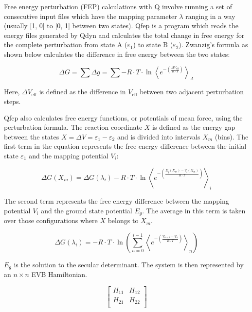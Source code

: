 \documentclass{article}
\begin{document}
Free energy perturbation (FEP) calculations with Q involve running a set of consecutive input files which have the mapping parameter $\lambda$ ranging in a way (usually [1, 0] to [0, 1] between two states). Qfep is a program which reads the energy files generated by Qdyn and calculates the total change in free energy for the complete perturbation from state A ($\varepsilon_1$) to state B ($\varepsilon_2$). Zwanzig’s formula as shown below calculates the difference in free energy between the two states:

\begin{equation}
    \Delta G = \sum \Delta g = \sum -R \cdot T \cdot \ln \left\langle e^{-\left(\frac{\Delta V_{\text{eff}}}{R \cdot T}\right)} \right\rangle_{A}
\end{equation}

Here, \(\Delta V_{\text{eff}}\) is defined as the difference in \( V_{\text{eff}} \) between two adjacent perturbation steps. 

Qfep also calculates free energy functions, or potentials of mean force, using the perturbation formula. The reaction coordinate \(X\) is defined as the energy gap between the states \(X = \Delta V = \varepsilon_1 - \varepsilon_2\) and is divided into intervals \(X_m\) (bins). The first term in the equation represents the free energy difference between the initial state \(\varepsilon_1\) and the mapping potential \(V_i\):

\begin{equation}
    \Delta G(X_m) = \Delta G (\lambda_i) - R \cdot T \cdot \ln \left\langle e^{-\left(\frac{E_g(X_m) - V_i(X_m)}{R \cdot T}\right)} \right\rangle_{i}
\end{equation}

The second term represents the free energy difference between the mapping potential \(V_i\) and the ground state potential \(E_g\). The average in this term is taken over those configurations where \(X\) belongs to \(X_m\).

\begin{equation}
    \Delta G(\lambda_i) = - R \cdot T \cdot \ln \left( \sum_{n=0}^{i-1} \left\langle e^{-\left(\frac{V_{n+1} - V_n}{R \cdot T}\right)} \right\rangle_{n} \right)
\end{equation}

\(E_g\) is the solution to the secular determinant. The system is then represented by an \(n \times n\) EVB Hamiltonian.

\[ 
  \left[\begin{array}{cc}
    H_{11} & H_{12} \\
    H_{21} & H_{22} \\
  \end{array}\right]
\]
\end{document}
